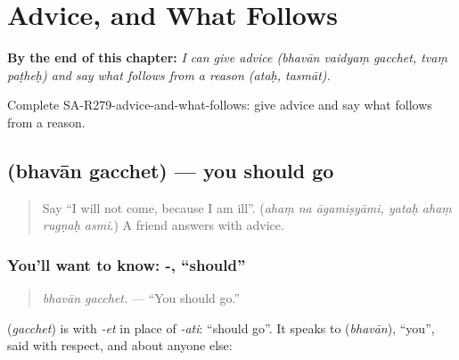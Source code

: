 
\chapter{Advice, and What Follows}
\label{ch:sa-advice-and-what-follows}

\begin{chapteropening}
\textbf{By the end of this chapter:} \emph{I can give advice (bhavān vaidyaṃ gacchet, tvaṃ paṭheḥ) and say what follows from a reason (ataḥ, tasmāt).}

Complete SA-R279-advice-and-what-follows: give advice and say what follows from a reason.
\end{chapteropening}

\section[\texorpdfstring{\sk{भवान्} \sk{गच्छेत्} (bhavān gacchet)}{भवान् गच्छेत् (bhavān gacchet)}]{  (bhavān gacchet) — you should go}

\label{lesson:SA-C279-bhavan-gacchet}



\begin{quote}
Say \textquotedblleft{}I will not come, because I am ill\textquotedblright{}. (\emph{ahaṃ na āgamiṣyāmi, yataḥ ahaṃ rugṇaḥ asmi}.) A friend answers with advice.
\end{quote}

\subsection*{You'll want to know: -, \textquotedblleft{}should\textquotedblright{}}
\begin{quote}
\textbf{ }
\end{quote}

\begin{quote}
\emph{bhavān gacchet.} — \textquotedblleft{}You should go.\textquotedblright{}
\end{quote}

\textbf{} (\emph{gacchet}) is \textbf{} with \emph{-et} in place of \emph{-ati}: \textquotedblleft{}should go\textquotedblright{}. It speaks to \textbf{} (\emph{bhavān}), \textquotedblleft{}you\textquotedblright{}, said with respect, and about anyone else:

